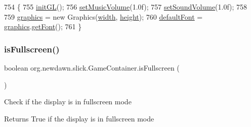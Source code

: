 \begin{DoxyCode}
754                                                       \{
755         \mbox{\hyperlink{classorg_1_1newdawn_1_1slick_1_1_game_container_a8cef7158ee723477c3435e791b21df66}{initGL}}();
756         \mbox{\hyperlink{classorg_1_1newdawn_1_1slick_1_1_game_container_aec3a92df093fecdc3093b38c7b57b0bf}{setMusicVolume}}(1.0f);
757         \mbox{\hyperlink{classorg_1_1newdawn_1_1slick_1_1_game_container_aa023e8d1edafe3d1a57a04d32e85dc9f}{setSoundVolume}}(1.0f);
758         
759         \mbox{\hyperlink{classorg_1_1newdawn_1_1slick_1_1_game_container_ab33d45e90ae9dcfcfd9c7a907415a58b}{graphics}} = \textcolor{keyword}{new} Graphics(\mbox{\hyperlink{classorg_1_1newdawn_1_1slick_1_1_game_container_a8c65160202b9f5aafde3fcf03e6155c9}{width}}, \mbox{\hyperlink{classorg_1_1newdawn_1_1slick_1_1_game_container_aac7312a21bbcaabec14be965c683d970}{height}});
760         \mbox{\hyperlink{classorg_1_1newdawn_1_1slick_1_1_game_container_a42d2acd12fa335270fdea3fd9d739d55}{defaultFont}} = \mbox{\hyperlink{classorg_1_1newdawn_1_1slick_1_1_game_container_ab33d45e90ae9dcfcfd9c7a907415a58b}{graphics}}.\mbox{\hyperlink{classorg_1_1newdawn_1_1slick_1_1_graphics_af9f0de1e447b9b89efa43908b4ace819}{getFont}}();
761     \}
\end{DoxyCode}
\mbox{\label{classorg_1_1newdawn_1_1slick_1_1_game_container_a320dea546301aa5256e14c4da2142534}} 
\subsubsection{\texorpdfstring{is\+Fullscreen()}{isFullscreen()}}
{\footnotesize\ttfamily boolean org.\+newdawn.\+slick.\+Game\+Container.\+is\+Fullscreen (\begin{DoxyParamCaption}{ }\end{DoxyParamCaption})\hspace{0.3cm}{\ttfamily [inline]}}

Check if the display is in fullscreen mode

\begin{DoxyReturn}{Returns}
True if the display is in fullscreen mode 
\end{DoxyReturn}

